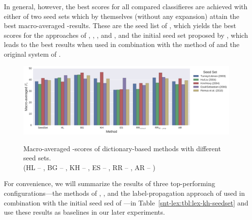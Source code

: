 In general, however, the best scores for all compared classifieres are
achieved with either of two seed sets which by themselves (without any
expansion) attain the best macro-averaged \F{}-results.  These are the
seed list of \citet{Kim:04}, which yields the best scores for the
approaches of \citet{Blair-Goldensohn:08}, \citet{Kim:04,Kim:06},
\citet{Rao:09}, and \citet{Awadallah:10}, and the initial seed set
proposed by \citet{Esuli:06c}, which leads to the best results when
used in combination with the method of \citet{Hu:04} and the original
system of \citet{Esuli:06c}.

\begin{figure}[hbtp!]
{
  \centering
  \includegraphics[width=\linewidth]{img/sentilex-alt-seed-sets.png}
}
\caption{Macro-averaged \F{}-scores of dictionary-based methods with
  different seed sets.\\ {\small (HL -- \citet{Hu:04}, BG --
    \citet{Blair-Goldensohn:08}, KH -- \citet{Kim:04,Kim:06}, ES --
    \citet{Esuli:06c}, RR -- \citet{Rao:09}, AR --
    \citet{Awadallah:10})}}\label{snt:fig:sent-lex-alt-seeds}
\end{figure}

For convenience, we will summarize the results of three top-performing
configurations---the methods of \citet{Blair-Goldensohn:08},
\citet{Kim:04,Kim:06}, and the label-propagation approach of
\citet{Rao:09} used in combination with the initial seed sed of
\citet{Kim:04}---in Table~\ref{snt-lex:tbl:lex-kh-seedset} and use
these results as baselines in our later experiments.


